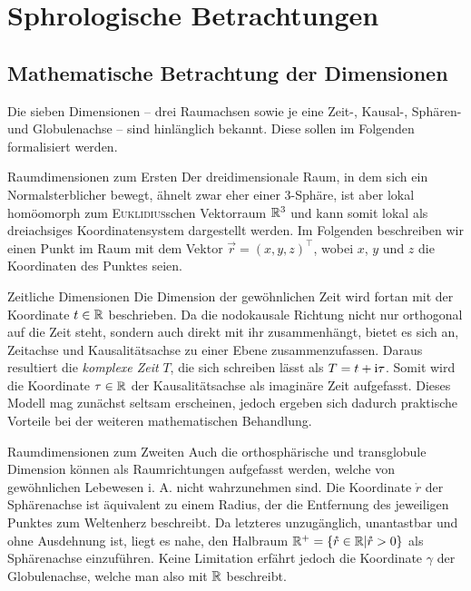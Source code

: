\chapter[tocentry=Sphärologische Betrachtungen, head=Sphärologische Betrachtungen]{Sph\aech rologische Betrachtungen}
\section{Mathematische Betrachtung der Dimensionen}
Die sieben Dimensionen -- drei Raumachsen sowie je eine Zeit-, Kausal-, Sphären- und Globulenachse -- sind hinlänglich bekannt. Diese sollen im Folgenden formalisiert werden.
\begin{bla}{Raumdimensionen zum Ersten}
Der dreidimensionale Raum, in dem sich ein Normalsterblicher bewegt, ähnelt zwar eher einer 3-Sphäre, ist aber lokal homöomorph zum \textsc{Euklidius}schen Vektorraum $\mathbb{R}^3$ und kann somit lokal als dreiachsiges Koordinatensystem dargestellt werden. Im Folgenden beschreiben wir einen Punkt im Raum mit dem Vektor $\vec{r}=(x,y,z)^\top$, wobei $x$, $y$ und $z$ die Koordinaten des Punktes seien.
\end{bla}
\begin{bla}{Zeitliche Dimensionen}
Die Dimension der gewöhnlichen Zeit wird fortan mit der Koordinate $t\in\mathbb{R}$ beschrieben. Da die nodokausale Richtung nicht nur orthogonal auf die Zeit steht, sondern auch direkt mit ihr zusammenhängt, bietet es sich an, Zeitachse und Kausalitätsachse zu einer Ebene zusammenzufassen. Daraus resultiert die \emph{komplexe Zeit} $T$, die sich schreiben lässt als $T=t+\text{\rmfamily i}\tau$. Somit wird die Koordinate $\tau\in\mathbb{R}$ der Kausalitätsachse als imaginäre Zeit aufgefasst. Dieses Modell mag zunächst seltsam erscheinen, jedoch ergeben sich dadurch praktische Vorteile bei der weiteren mathematischen Behandlung.
\end{bla}
\begin{bla}{Raumdimensionen zum Zweiten}
Auch die orthosphärische und transglobule Dimension können als Raumrichtungen aufgefasst werden, welche von gewöhnlichen Lebewesen i. A. nicht wahrzunehmen sind. Die Koordinate $\mathring{r}$ der Sphärenachse ist äquivalent zu einem Radius, der die Entfernung des jeweiligen Punktes zum Weltenherz beschreibt. Da letzteres unzugänglich, unantastbar und ohne Ausdehnung ist, liegt es nahe, den Halbraum $\mathbb{R}^+=\{\mathring{r}\in\mathbb{R}|\mathring{r}>0\}$ als Sphärenachse einzuführen. Keine Limitation erfährt jedoch die Koordinate $\gamma$ der Globulenachse, welche man also mit $\mathbb{R}$ beschreibt.
\end{bla}
